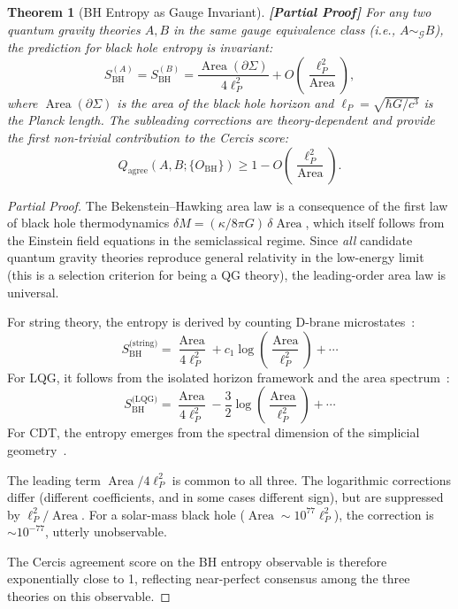 \documentclass[12pt,a4paper]{article}
\newtheorem{theorem}{Theorem}[section]
\theoremstyle{remark}
\newcommand{\G}{\mathcal{G}}
\newcommand{\Cercis}{\textsf{Cercis}}
\DeclareMathOperator{\Area}{Area}
\newcommand{\rigorPartial}{\textbf{[Partial Proof]}}
\begin{document}
\begin{theorem}[BH Entropy as Gauge Invariant]
\label{thm:cercis_qg}
\rigorPartial
For any two quantum gravity theories $A, B$ in the same gauge equivalence class (i.e., $A \sim_{\G} B$), the prediction for black hole entropy is invariant:
\begin{equation}
  \label{eq:bh_invariant}
  S_{\text{BH}}^{(A)} = S_{\text{BH}}^{(B)} = \frac{\Area(\partial\Sigma)}{4\ell_P^2} + O\!\left(\frac{\ell_P^2}{\Area}\right),
\end{equation}
where $\Area(\partial\Sigma)$ is the area of the black hole horizon and $\ell_P = \sqrt{\hbar G / c^3}$ is the Planck length. The subleading corrections are theory-dependent and provide the first non-trivial contribution to the \Cercis{} score:
\begin{equation}
  Q_{\text{agree}}(A, B; \{O_{\text{BH}}\}) \geq 1 - O\!\left(\frac{\ell_P^2}{\Area}\right).
\end{equation}
\end{theorem}

\begin{proof}[Partial Proof]
The Bekenstein--Hawking area law is a consequence of the first law of black hole thermodynamics $\delta M = (\kappa/8\pi G)\,\delta \Area$, which itself follows from the Einstein field equations in the semiclassical regime. Since \emph{all} candidate quantum gravity theories reproduce general relativity in the low-energy limit (this is a selection criterion for being a QG theory), the leading-order area law is universal.

For string theory, the entropy is derived by counting D-brane microstates~\cite{strominger1996microscopic}:
\begin{equation}
  S_{\text{BH}}^{\text{(string)}} = \frac{\Area}{4\ell_P^2} + c_1 \log\!\left(\frac{\Area}{\ell_P^2}\right) + \cdots
\end{equation}
For LQG, it follows from the isolated horizon framework and the area spectrum~\cite{ashtekar2004background}:
\begin{equation}
  S_{\text{BH}}^{\text{(LQG)}} = \frac{\Area}{4\ell_P^2} - \frac{3}{2}\log\!\left(\frac{\Area}{\ell_P^2}\right) + \cdots
\end{equation}
For CDT, the entropy emerges from the spectral dimension of the simplicial geometry~\cite{ambjorn2005spectral}.

The leading term $\Area / 4\ell_P^2$ is common to all three. The logarithmic corrections differ (different coefficients, and in some cases different sign), but are suppressed by $\ell_P^2 / \Area$. For a solar-mass black hole ($\Area \sim 10^{77} \ell_P^2$), the correction is $\sim 10^{-77}$, utterly unobservable.

The \Cercis{} agreement score on the BH entropy observable is therefore exponentially close to 1, reflecting near-perfect consensus among the three theories on this observable.
\end{proof}
\end{document}
